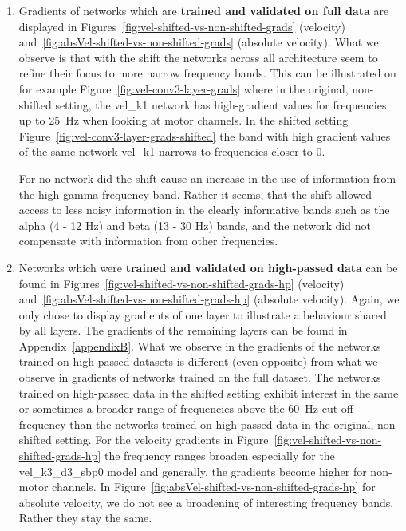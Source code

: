 \begin{enumerate}
    \item Gradients of networks which are \textbf{trained and validated on full data} are displayed in Figures~\ref{fig:vel-shifted-vs-non-shifted-grads} (velocity) and~\ref{fig:absVel-shifted-vs-non-shifted-grads} (absolute velocity).
    What we observe is that with the shift the networks across all architecture seem to refine their focus to more narrow frequency bands.
    This can be illustrated on for example Figure~\ref{fig:vel-conv3-layer-grads} where in the original, non-shifted setting, the vel\_k1 network has high-gradient values for frequencies up to 25~Hz when looking at motor channels.
    In the shifted setting Figure~\ref{fig:vel-conv3-layer-grads-shifted} the band with high gradient values of the same network vel\_k1 narrows to frequencies closer to 0.
    
    For no network  did the shift cause an increase in the use of information from the high-gamma frequency band.
    Rather it seems, that the shift allowed access to less noisy information in the clearly informative bands such as the alpha (4 - 12 Hz) and beta (13 - 30 Hz) bands, and the network did not compensate with information from other frequencies.
    
    \item Networks which were \textbf{trained and validated on high-passed data} can be found in Figures~\ref{fig:vel-shifted-vs-non-shifted-grads-hp} (velocity) and~\ref{fig:absVel-shifted-vs-non-shifted-grads-hp} (absolute velocity).
    Again, we only chose to display gradients of one layer to illustrate a behaviour shared by all layers.
    The gradients of the remaining layers can be found in Appendix~\ref{appendixB}.
    What we observe in the gradients of the networks trained on high-passed datasets is different (even opposite) from what we observe in gradients of networks trained on the full dataset.
    The networks trained on high-passed data in the shifted setting exhibit interest in the same or sometimes a broader range of frequencies above the 60~Hz cut-off frequency than the networks trained on high-passed data in the original, non-shifted setting. 
    For the velocity gradients in Figure~\ref{fig:vel-shifted-vs-non-shifted-grads-hp} the frequency ranges broaden especially for the vel\_k3\_d3\_sbp0 model and generally, the gradients become higher for non-motor channels.
    In Figure~\ref{fig:absVel-shifted-vs-non-shifted-grads-hp} for absolute velocity, we do not see a broadening of interesting frequency bands. Rather they stay the same.
    

\end{enumerate}
